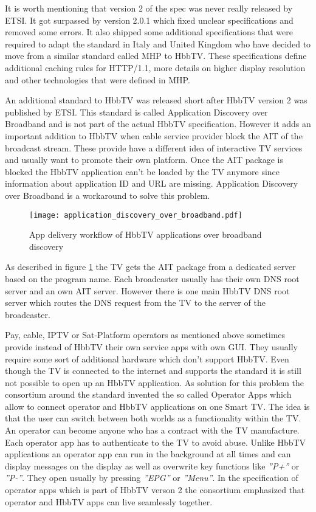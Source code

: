 It is worth mentioning that version 2 of the spec was never really released by ETSI. It got
surpassed by version 2.0.1 which fixed unclear specifications and removed some errors. It also
shipped some additional specifications that were required to adapt the standard in Italy and United
Kingdom who have decided to move from a similar standard called MHP to HbbTV. These specifications
define additional caching rules for HTTP/1.1, more details on higher display resolution and other
technologies that were defined in MHP.

An additional standard to HbbTV was released short after HbbTV version 2 was published by ETSI.
This standard is called Application Discovery over Broadband and is not part of the actual
HbbTV specification. However it adds an important addition to HbbTV when cable service provider block
the AIT of the broadcast stream. These provide have a different idea of interactive TV services
and usually want to promote their own platform. Once the AIT package is blocked the HbbTV application
can't be loaded by the TV anymore since information about application ID and URL are missing.
Application Discovery over Broadband is a workaround to solve this problem.

\begin{figure}[htb]
  \centering
  \texttt{[image: application\_discovery\_over\_broadband.pdf]}\\
  \caption{App delivery workflow of HbbTV applications over broadband discovery}\label{fig:application_discovery_over_broadband}
\end{figure}

As described in figure \ref{fig:application_discovery_over_broadband} the TV gets the AIT package
from a dedicated server based on the program name. Each broadcaster usually has their own DNS
root server and an own AIT server. However there is one main HbbTV DNS root server which routes the
DNS request from the TV to the server of the broadcaster.

Pay, cable, IPTV or Sat-Platform operators as mentioned above sometimes provide instead of HbbTV
their own service apps with own GUI. They usually require some sort of additional hardware which
don't support HbbTV. Even though the TV is connected to the internet and supports the standard
it is still not possible to open up an HbbTV application. As solution for this problem the
consortium around the standard invented the so called Operator Apps which allow to connect
operator and HbbTV applications on one Smart TV. The idea is that the user can switch between
both worlds as a functionality within the TV. An operator can become anyone who has a contract
with the TV manufacture. Each operator app has to authenticate to the TV to avoid abuse. Unlike
HbbTV applications an operator app can run in the background at all times and can display
messages on the display as well as overwrite key functions like \textit{''P+''} or \textit{''P-''}.
They open usually by pressing \textit{''EPG''} or \textit{''Menu''}. In the specification of
operator apps which is part of HbbTV verson 2 the consortium emphasized that operator and HbbTV
apps can live seamlessly together.

